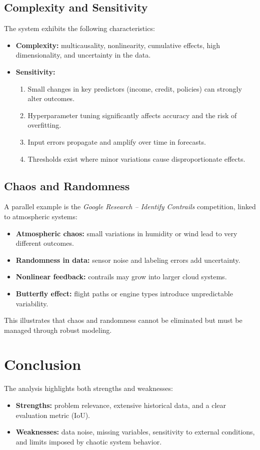 \documentclass[conference]{IEEEtran}
\begin{document}
\subsection{Complexity and Sensitivity}
The system exhibits the following characteristics:
\begin{itemize}[noitemsep]
    \item \textbf{Complexity:} multicausality, nonlinearity, cumulative effects, high dimensionality, and uncertainty in the data.
    \item \textbf{Sensitivity:}
    \begin{enumerate}[label=\alph*)]
        \item Small changes in key predictors (income, credit, policies) can strongly alter outcomes.
        \item Hyperparameter tuning significantly affects accuracy and the risk of overfitting.
        \item Input errors propagate and amplify over time in forecasts.
        \item Thresholds exist where minor variations cause disproportionate effects.
    \end{enumerate}
\end{itemize}

\subsection{Chaos and Randomness}
A parallel example is the \textit{Google Research – Identify Contrails} competition, linked to atmospheric systems:
\begin{itemize}[noitemsep]
    \item \textbf{Atmospheric chaos:} small variations in humidity or wind lead to very different outcomes.
    \item \textbf{Randomness in data:} sensor noise and labeling errors add uncertainty.
    \item \textbf{Nonlinear feedback:} contrails may grow into larger cloud systems.
    \item \textbf{Butterfly effect:} flight paths or engine types introduce unpredictable variability.
\end{itemize}
This illustrates that chaos and randomness cannot be eliminated but must be managed through robust modeling.

\section{Conclusion}
The analysis highlights both strengths and weaknesses:
\begin{itemize}[noitemsep]
    \item \textbf{Strengths:} problem relevance, extensive historical data, and a clear evaluation metric (IoU).
    \item \textbf{Weaknesses:} data noise, missing variables, sensitivity to external conditions, and limits imposed by chaotic system behavior.
\end{itemize}
\end{document}
